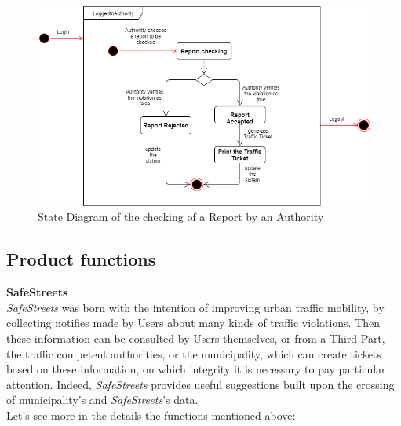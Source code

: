     \begin{figure}[h!]
        \centering
        \includegraphics[scale=0.5]{Images/StateDiag_verifyReport.png}
        \caption{State Diagram of the checking of a Report by an Authority}
    \end{figure}


\subsection{Product
functions}

\textbf{SafeStreets}\\

\textit{SafeStreets} was born with the intention of improving urban traffic mobility, by collecting notifies made by Users about many kinds of traffic violations. Then these information can be consulted by Users themselves, or from a Third Part, the traffic competent authorities, or the municipality, which can create tickets based on these information, on which integrity it is necessary to pay particular attention. Indeed, \textit{SafeStreets} provides useful suggestions built upon the crossing of municipality's and \textit{SafeStreets}'s data. \\
Let's see more in the details the functions mentioned above:\\\\

